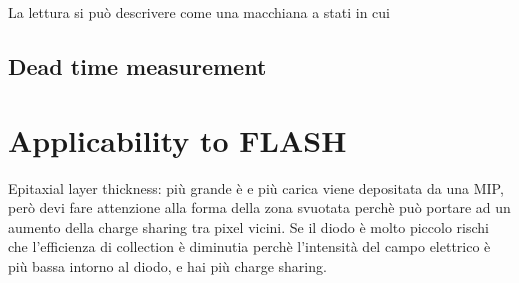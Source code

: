     La lettura si può descrivere come una macchiana a stati in cui 

    
    \subsection{Dead time measurement}


\section{Applicability to FLASH}
Epitaxial layer thickness: più grande è e più carica viene depositata da una MIP, però devi fare attenzione alla forma della zona svuotata perchè può portare ad un aumento della charge sharing tra pixel vicini. Se il diodo è molto piccolo rischi che l'efficienza di collection è diminutia perchè l'intensità del campo elettrico è più bassa intorno al diodo, e hai più charge sharing.\\